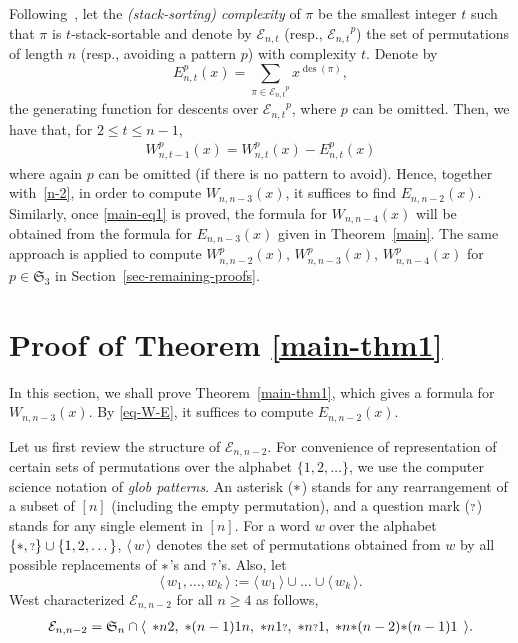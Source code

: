 \documentclass[11pt]{article}
\newcommand{\exactly}[2]{\ensuremath{\mathcal{E}_{#1,#2}}}
\newcommand{\sym}{\mathfrak{S}}
\newcommand{\st}{\mbox{\ensuremath{\ast}}}
\newcommand{\q}{\mbox{\ensuremath{\scriptstyle{?}}}}
\newcommand{\+}{\mbox{\ensuremath{\scriptstyle{+}}}}
\newcommand{\glob}[1]{\ensuremath{\langle\, #1\,\rangle}}
\DeclareMathOperator{\des}{des}
\begin{document}
Following~\cite{Claesson2010Permutations}, let the
\emph{(stack-sorting) complexity} of $\pi$ be the
smallest integer $t$ such that $\pi$ is $t$-stack-sortable and
denote by  $\exactly{n}{t}$ (resp.,  $\exactly{n}{t}^p$) the set of permutations of length $n$ (resp., avoiding a pattern $p$) with  complexity $t$.
Denote  by
$$E^p_{n, t}(x)= \sum_{\pi \in\exactly{n}{t}^p}x^{\des (\pi)},$$
the  generating function for descents over $\exactly{n}{t}^p$, where $p$ can be omitted.
Then, we have that, for $2 \le t \le n-1$,
\begin{align}\label{eq-W-E}
	W^{p}_{n, t-1}(x)   =W^{p}_{n, t}(x)  - E^{p}_{n, t}(x)
\end{align}
where again $p$ can be omitted (if there is no pattern to avoid). Hence, together with~\eqref{n-2}, in order to compute $W_{n,n-3}(x)$, it suffices to find $E_{n,n-2}(x)$.
Similarly, once \eqref{main-eq1} is proved, the formula for $W_{n,n-4}(x)$ will be obtained from the formula for $E_{n,n-3}(x)$ given in Theorem~\ref{main}. The same approach is applied to compute $W^p_{n,n-2}(x)$, $W^p_{n,n-3}(x)$, $W^p_{n,n-4}(x)$ for $p\in\mathfrak{S}_3$ in Section~\ref{sec-remaining-proofs}.

\section{Proof of Theorem \ref{main-thm1}}\label{sect-2}

In this section, we shall prove Theorem~\ref{main-thm1}, which gives a formula for $W_{n,n-3}(x)$.
By \eqref{eq-W-E}, it suffices to compute $E_{n,n-2}(x)$.

Let us first review the structure of $\exactly{n}{n-2}$.
For convenience of  representation of certain sets of permutations over the alphabet $\{1,2,\ldots\}$, we use the  computer science notation of \emph{glob patterns}.  An asterisk ($\st$) stands
for any rearrangement of a subset of $[n]$ (including the empty permutation), and  a question mark
($\q$) stands for any single element in $[n]$.
For a word $w$ over the alphabet $\{\st,\q\}\cup\{1,2,\dots\}$, $\glob{w}$ denotes the set of
permutations obtained from $w$ by all possible replacements of $\st$'s and $\q$'s.  Also,  let
$$\glob{w_1,\dots,w_k} := \glob{w_1}\cup\dots\cup\glob{w_k}.$$
West  \cite{West1990Permutations}  characterized $\exactly{n}{n-2}$ for all $n\geq 4$ as follows,
\begin{align}\label{West-n-2-exact}
	\exactly{n}{n-2} = \sym_n \cap
	\glob{\;\st n2,\;\st(n-1)1n,\; \st n1\q,\; \st n\q 1,
		\; \st n\st (n-2)\st (n-1)1\;}.
\end{align}
\end{document}
